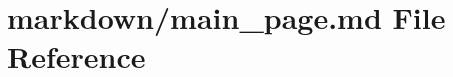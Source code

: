 \hypertarget{main__page_8md}{}\section{markdown/main\+\_\+page.md File Reference}
\label{main__page_8md}
